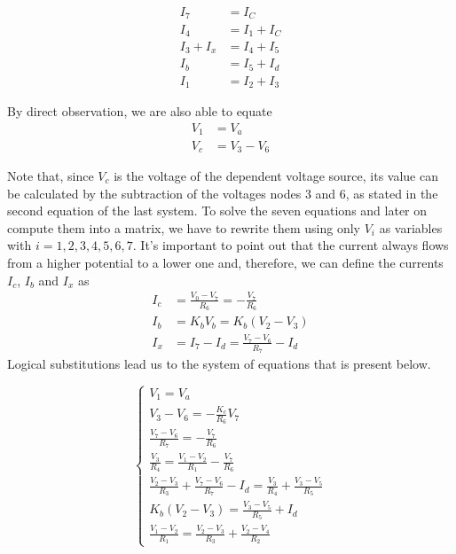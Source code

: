 \begin{align*}
I_7&=I_C \\ 
I_4&=I_1+I_C\\
I_3+I_x&=I_4+I_5 \\
I_b&=I_5+I_d \\
I_1&=I_2+I_3
\end{align*}

By direct observation, we are also able to equate
\begin{align*}
V_1&=V_a \\
V_c&=V_3-V_6
\end{align*}

Note that, since $V_c$ is the voltage of the dependent voltage source, its value can be calculated by the subtraction of the voltages nodes $3$ and $6$, as stated in the second equation of the last system. To solve the seven equations and later on compute them into a matrix, we have to rewrite them using only $V_i$ as variables with $i=1,2,3,4,5,6,7$. It's important to point out that the current always flows from a higher potential to a lower one and, therefore, we can define the currents $I_c$, $I_b$ and $I_x$ as
\begin{align*}
I_c&=\frac{V_0-V_7}{R_6}=-\frac{V_7}{R_6}\\
I_b&=K_bV_b=K_b(V_2-V_3)\\
I_x&=I_7-I_d=\frac{V_7-V_6}{R_7}-I_d
\end{align*}
Logical substitutions lead us to the system of equations that is present below.\par

$$
\begin{cases}
  V_1=V_a\\
  V_3-V_6=-\frac{K_c}{R_6}V_7\\
  \frac{V_7-V_6}{R_7}=-\frac{V_7}{R_6}\\
  \frac{V_3}{R_4}=\frac{V_1-V_2}{R_1}-\frac{V_7}{R_6}\\
  \frac{V_2-V_3}{R_3}+\frac{V_7-V_6}{R_7}-I_d=\frac{V_3}{R_4}+\frac{V_3-V_5}{R_5}\\
  K_b(V_2-V_3)=\frac{V_3-V_5}{R_5}+I_d\\
  \frac{V_1-V_2}{R_1}=\frac{V_2-V_3}{R_3}+\frac{V_2-V_4}{R_2}
\end{cases}
$$

